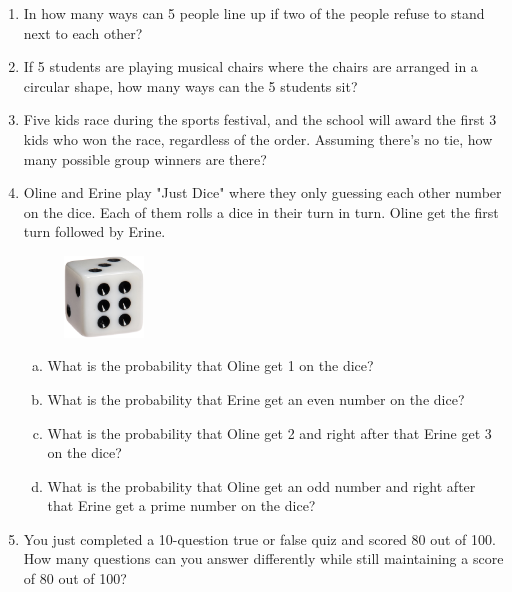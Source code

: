 \documentclass[11pt]{scrartcl}
\begin{document}
\begin{enumerate}
    \item In how many ways can 5 people line up if two of the people refuse to stand next to each other?
    \item If 5 students are playing musical chairs where the chairs are arranged in a circular shape, how many ways can the 5 students sit?
    \item Five kids race during the sports festival, and the school will award the first 3 kids who won the race, regardless of the order. Assuming there's no tie, how many possible group winners are there?
    \item Oline and Erine play "Just Dice" where they only guessing each other number on the dice. Each of them rolls a dice in their turn in turn. Oline get the first turn followed by Erine.
    \begin{figure}[h]
        \centering
        \includegraphics[width=0.2\textwidth]{StarGen/0Figure/dice-1.jpg}
    \end{figure}
    \begin{enumerate}[a)]
        \item What is the probability that Oline get 1 on the dice?
        \item What is the probability that Erine get an even number on the dice?
        \item What is the probability that Oline get 2 and right after that Erine get 3 on the dice?
        \item What is the probability that Oline get an odd number and right after that Erine get a prime number on the dice?
    \end{enumerate}

    
    \item You just completed a 10-question true or false quiz and scored 80 out of 100. How many questions can you answer differently while still maintaining a score of 80 out of 100?
\end{enumerate}
\end{document}
